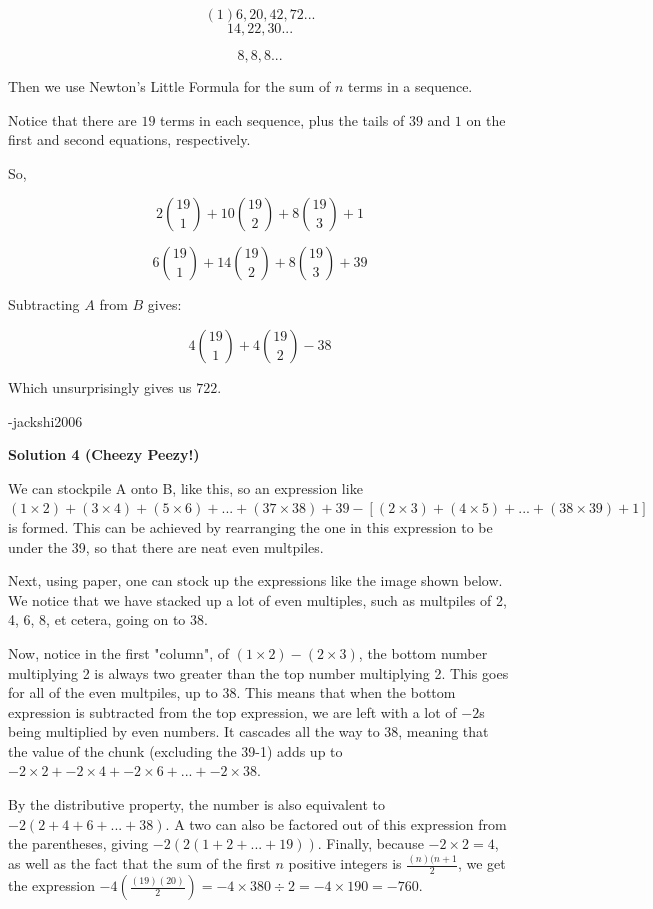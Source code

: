 \begin{enumerate}
 
 \[(1) 6, 20, 42, 72...\]
 \[14, 22, 30...\]

 \[8, 8, 8...\]

 
Then we use Newton's Little Formula for the sum of $n$ terms in a sequence.

 Notice that there are $19$ terms in each sequence, plus the tails of $39$ and $1$ on the first and second equations, respectively.

 
So,

 

 \[2\binom{19}{1}+10\binom{19}{2}+8\binom{19}{3}+1\]

 \[6\binom{19}{1}+14\binom{19}{2}+8\binom{19}{3}+39\]

 
Subtracting $A$ from $B$ gives:

 

 \[4\binom{19}{1}+4\binom{19}{2}-38\]

 
Which unsurprisingly gives us $\boxed{722}.$

 
-jackshi2006

 



\textbf{Solution 4 (Cheezy Peezy!)}

We can stockpile A onto B, like this, so an expression like $(1 \times 2) + (3 \times 4) + (5 \times 6) + ... + (37\times 38) + 39 - [(2 \times 3) + (4 \times 5) + ... + (38 \times 39) +1]$ is formed. This can be achieved by rearranging the one in this expression to be under the 39, so that there are neat even multpiles. 

 Next, using paper, one can stock up the expressions like the image shown below. We notice that we have stacked up a lot of even multiples, such as multpiles of 2, 4, 6, 8, et cetera, going on to 38. 

 Now, notice in the first "column", of $(1 \times 2) - (2 \times 3)$, the bottom number multiplying 2 is always two greater than the top number multiplying 2. This goes for all of the even multpiles, up to 38. This means that when the bottom expression is subtracted from the top expression, we are left with a lot of $-2$s being multiplied by even numbers. It cascades all the way to 38, meaning that the value of the chunk (excluding the 39-1) adds up to $-2\times 2 + -2 \times 4 + -2 \times 6 + ... + -2 \times 38$. 

 By the distributive property, the number is also equivalent to $-2(2+4+6+...+38)$. A two can also be factored out of this expression from the parentheses, giving $-2(2(1+2+...+19))$. Finally, because $-2 \times 2 = 4$, as well as the fact that the sum of the first $n$ positive integers is $\frac{(n)(n+1}{2}$, we get the expression $-4(\frac{(19)(20)}{2}) = -4 \times 380 \div 2 = -4 \times 190 = -760.$ 


\end{enumerate}
